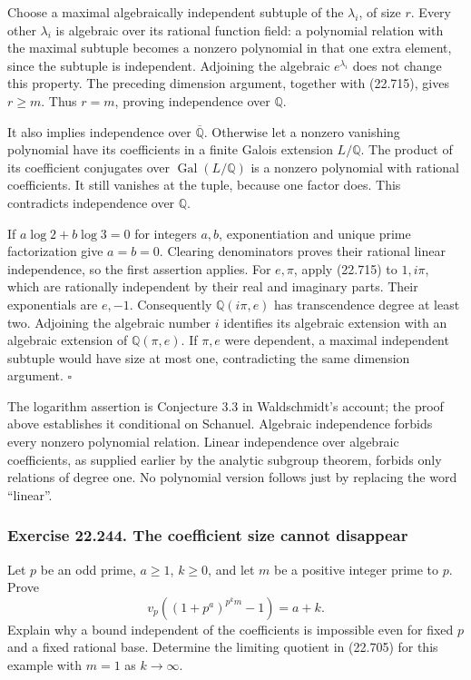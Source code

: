 \documentclass[
  11pt,
  a4paper,
]{article}
\begin{document}
Choose a maximal algebraically independent subtuple of the
\(\lambda_i\), of size \(r\). Every other \(\lambda_i\) is algebraic
over its rational function field: a polynomial relation with the maximal
subtuple becomes a nonzero polynomial in that one extra element, since
the subtuple is independent. Adjoining the algebraic \(e^{\lambda_i}\)
does not change this property. The preceding dimension argument,
together with (22.715), gives \(r\ge m\). Thus \(r=m\), proving
independence over \(\mathbb Q\).

It also implies independence over \(\overline{\mathbb Q}\). Otherwise
let a nonzero vanishing polynomial have its coefficients in a finite
Galois extension \(L/\mathbb Q\). The product of its coefficient
conjugates over \(\operatorname{Gal}(L/\mathbb Q)\) is a nonzero
polynomial with rational coefficients. It still vanishes at the tuple,
because one factor does. This contradicts independence over
\(\mathbb Q\).

If \(a\log2+b\log3=0\) for integers \(a,b\), exponentiation and unique
prime factorization give \(a=b=0\). Clearing denominators proves their
rational linear independence, so the first assertion applies. For
\(e,\pi\), apply (22.715) to \(1,i\pi\), which are rationally
independent by their real and imaginary parts. Their exponentials are
\(e,-1\). Consequently \(\mathbb Q(i\pi,e)\) has transcendence degree at
least two. Adjoining the algebraic number \(i\) identifies its algebraic
extension with an algebraic extension of \(\mathbb Q(\pi,e)\). If
\(\pi,e\) were dependent, a maximal independent subtuple would have size
at most one, contradicting the same dimension argument. \(\square\)

The logarithm assertion is Conjecture 3.3 in Waldschmidt's account; the
proof above establishes it conditional on Schanuel. Algebraic
independence forbids every nonzero polynomial relation. Linear
independence over algebraic coefficients, as supplied earlier by the
analytic subgroup theorem, forbids only relations of degree one. No
polynomial version follows just by replacing the word ``linear''.

\subsubsection{Exercise 22.244. The coefficient size cannot
disappear}\label{exercise-22.244.-the-coefficient-size-cannot-disappear}

Let \(p\) be an odd prime, \(a\ge1\), \(k\ge0\), and let \(m\) be a
positive integer prime to \(p\). Prove \[
 v_p((1+p^a)^{p^k m}-1)=a+k.
 \tag{22.716}
\] Explain why a bound independent of the coefficients is impossible
even for fixed \(p\) and a fixed rational base. Determine the limiting
quotient in (22.705) for this example with \(m=1\) as
\(k\longrightarrow\infty\).
\end{document}
